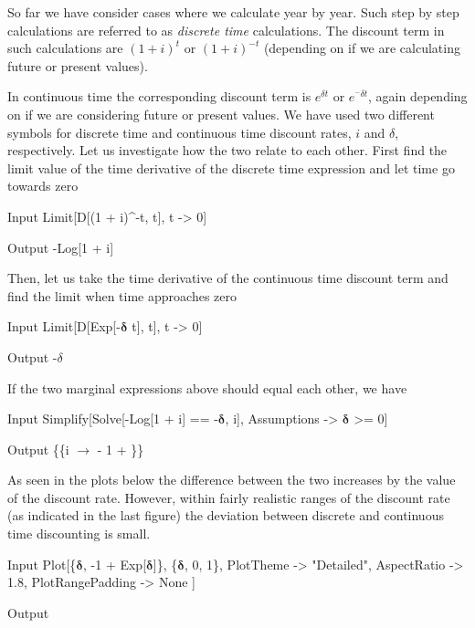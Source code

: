 \documentclass[11pt,fleqn]{book} %
\begin{document}
\begin{theorem}[Discounting]
So far we have consider cases where we calculate year by year. Such step by step calculations are referred to as \textit{discrete time} calculations. The discount term in such calculations are $(1 + i)^t$ or $(1 + i)^{-t}$ (depending on if we are calculating future or present values).

In continuous time the corresponding discount term is $e^{\delta t}$ or $e^{^-\delta t}$, again depending on if we are considering future or present values. We have used two different symbols for discrete time and continuous time discount rates, $i$ and $\delta$, respectively. Let us investigate how the two relate to each other. First find the limit value of the time derivative of the discrete time expression and let time go towards zero
\begin{mmaCell}{Input}
  Limit[D[(1 + i)^-t, t], t -> 0]
\end{mmaCell}
\begin{mmaCell}{Output}
  -Log[1 + i]
\end{mmaCell}
Then, let us take the time derivative of the continuous time discount term and find the limit when time approaches zero
\begin{mmaCell}{Input}
  Limit[D[Exp[-\(\pmb{\delta}\) t], t], t -> 0]
\end{mmaCell}
\begin{mmaCell}{Output}
  -\(\delta\)
\end{mmaCell}
If the two marginal expressions above should equal each other, we have
\begin{mmaCell}{Input}
  Simplify[Solve[-Log[1 + i] == -\(\pmb{\delta}\), i], Assumptions -> {\(\pmb{\delta}\) >= 0}]
\end{mmaCell}
\begin{mmaCell}{Output}
  \big\{\big\{i \(\to\) - 1 + \big\}\big\}
\end{mmaCell}
As seen in the plots below the difference between the two increases by the value of the discount rate. However, within fairly realistic ranges of the discount rate (as indicated in the last figure) the deviation between discrete and continuous time discounting is small.
\begin{mmaCell}{Input}
  Plot[\{\(\pmb{\delta}\), -1 + Exp[\(\pmb{\delta}\)]\}, \{\(\pmb{\delta}\), 0, 1\}, 
    PlotTheme        -> "Detailed", 
    AspectRatio      -> 1.8, 
    PlotRangePadding -> None
  ]
\end{mmaCell}
\begin{mmaCell}[moregraphics={moreig={scale=.7}}]{Output}

\end{mmaCell}
\end{theorem}
\end{document}
